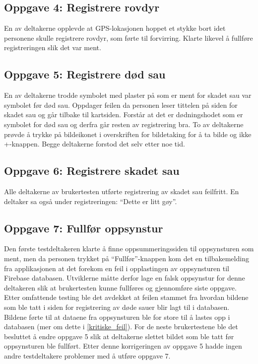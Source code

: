 \subsection{Oppgave 4: Registrere rovdyr}
En av deltakerne opplevde at GPS-lokasjonen hoppet et stykke bort idet personene skulle registrere rovdyr, som førte til forvirring. Klarte likevel å fullføre registreringen slik det var ment.

\subsection{Oppgave 5: Registrere død sau}
 En av deltakerne trodde symbolet med plaster på som er ment for skadet sau var symbolet før død sau. Oppdager feilen da personen leser tittelen på siden for skadet sau og går tilbake til kartsiden. Forstår at det er dødningshodet som er symbolet for død sau og derfra går resten av registrering bra.
 \newline
 \newline
To av deltakerne prøvde å trykke på bildeikonet i overskriften for bildetaking for å ta bilde og ikke +-knappen. Begge deltakerne forstod det selv etter noe tid. 

\subsection{Oppgave 6: Registrere skadet sau}
Alle deltakerne av brukertesten utførte registrering av skadet sau feilfritt. En deltaker sa også under registreringen: \enquote{Dette er litt gøy}. 

\subsection{Oppgave 7: Fullfør oppsynstur}
Den første testdeltakeren klarte å finne oppsummeringssiden til oppsynsturen som ment, men da personen trykket på \enquote{Fullfør}-knappen kom det en tilbakemelding fra applikasjonen at det forekom en feil i opplastingen av oppsynsturen til Firebase databasen. Utviklerne måtte derfor lage en falsk oppsynstur for denne deltakeren slik at brukertesten kunne fullføres og gjennomføre siste oppgave. Etter omfattende testing ble det avdekket at feilen stammet fra hvordan bildene som ble tatt i siden for registrering av døde sauer blir lagt til i databasen. Bildene førte til at dataene fra oppsynsturen ble for store til å lastes opp i databasen (mer om dette i \ref{kritiske_feil}). For de neste brukertestene ble det besluttet å endre oppgave 5 slik at deltakerne slettet bildet som ble tatt før oppsynsturen ble fullført. Etter denne korrigeringen av oppgave 5 hadde ingen andre testdeltakere problemer med å utføre oppgave 7.
 

